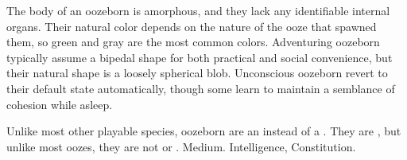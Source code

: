   The body of an oozeborn is amorphous, and they lack any identifiable internal organs.
  Their natural color depends on the nature of the ooze that spawned them, so green and gray are the most common colors.
  Adventuring oozeborn typically assume a bipedal shape for both practical and social convenience, but their natural shape is a loosely spherical blob.
  Unconscious oozeborn revert to their default state automatically, though some learn to maintain a semblance of cohesion while asleep.

   Unlike most other playable species, oozeborn are an  instead of a . They are , but unlike most oozes, they are not  or .
   Medium.
    Intelligence,  Constitution.
